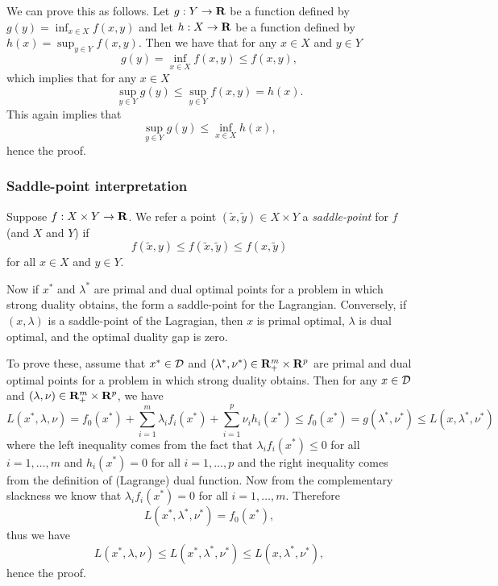 We can prove this as follows.
Let $g:Y\to\mathbf{R}$ be a function defined by $g(y) = \inf_{x \in X} f(x,y)$ and
let $h:X\to\mathbf{R}$ be a function defined by $h(x) = \sup_{y \in Y} f(x,y)$.
Then we have that for any $x\in X$ and $y\in Y$
\begin{equation}
g(y) = \inf_{x\in X} f(x,y) \leq f(x,y),
\end{equation}
which implies that for any $x\in X$
\begin{equation}
\sup_{y\in Y} g(y) \leq \sup_{y\in Y} f(x,y) = h(x).
\end{equation}
This again implies that
\begin{equation}
\sup_{y\in Y} g(y) \leq \inf_{x\in X} h(x),
\end{equation}
hence the proof.




\subsubsection{Saddle-point interpretation}

Suppose $f:X\times Y \to \mathbf{R}$.
We refer a point $(\tilde{x}, \tilde{y}) \in X\times Y$ a \emph{saddle-point}
for $f$ (and $X$ and $Y$) if
\begin{equation}
f(\tilde{x},y) \leq f(\tilde{x},\tilde{y}) \leq f(x, \tilde{y})
\end{equation}
for all $x \in X$ and $y\in Y$.

Now if $x^\ast$ and $\lambda^\ast$
are primal and dual optimal points for a problem in which strong duality obtains,
the form a saddle-point for the Lagrangian.
Conversely, if $(x,\lambda)$ is a saddle-point of the Lagragian, then $x$ is primal optimal, $\lambda$ is dual optimal,
and the optimal duality gap is zero.

To prove these, assume that $x^\ast\in\mathcal{D}$ and $(\lambda^\ast, \nu^\ast) \in \mathbf{R}^m_+ \times \mathbf{R}^p$
are primal and dual optimal points for a problem in which strong duality obtains.
Then for any $x\in\mathcal{D}$ and $(\lambda, \nu) \in \mathbf{R}^m_+ \times \mathbf{R}^p$,
we have
\begin{equation}
L(x^\ast, \lambda, \nu) =
f_0(x^\ast) + \sum_{i=1}^m \lambda_i f_i(x^\ast) + \sum_{i=1}^p \nu_i h_i(x^\ast)
\leq
f_0(x^\ast) = g(\lambda^\ast, \nu^\ast) \leq L(x,\lambda^\ast, \nu^\ast)
\end{equation}
where the left inequality comes from the fact that $\lambda_i f_i(x^\ast) \leq 0$ for all $i=1,\ldots, m$
and $h_i(x^\ast)=0$ for all $i=1,\ldots, p$
and the right inequality comes from the definition of (Lagrange) dual function.
Now from the complementary slackness we know that $\lambda_i f_i(x^\ast) = 0$ for all $i=1,\ldots, m$.
Therefore
\begin{equation}
L(x^\ast,\lambda^\ast, \nu^\ast) = f_0(x^\ast),
\end{equation}
thus we have
\begin{equation}
L(x^\ast, \lambda, \nu)
\leq L(x^\ast, \lambda^\ast, \nu^\ast)
\leq L(x, \lambda^\ast, \nu^\ast),
\end{equation}
hence the proof.

